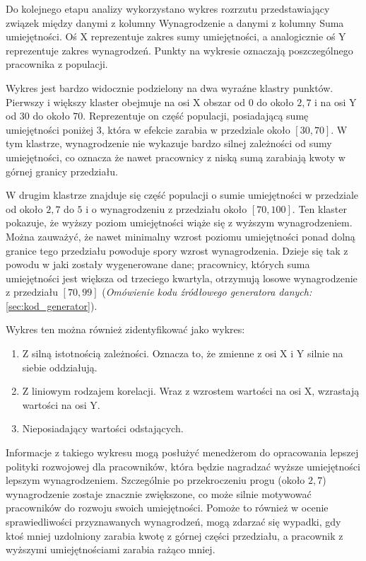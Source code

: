     \par Do kolejnego etapu analizy wykorzystano wykres rozrzutu przedstawiający związek między danymi z kolumny Wynagrodzenie a danymi z kolumny Suma umiejętności. Oś X reprezentuje zakres sumy umiejętności, a analogicznie oś Y reprezentuje zakres wynagrodzeń. Punkty na wykresie oznaczają poszczególnego pracownika z populacji.

    \par Wykres jest bardzo widocznie podzielony na dwa wyraźne klastry punktów. Pierwszy i większy klaster obejmuje na osi X obszar od $0$ do około $2,7$ i na osi Y od $30$ do około $70$. Reprezentuje on część populacji, posiadającą sumę umiejętności poniżej $3$, która w efekcie zarabia w przedziale około $[30, 70]$. W tym klastrze, wynagrodzenie nie wykazuje bardzo silnej zależności od sumy umiejętności, co oznacza że nawet pracownicy z niską sumą zarabiają kwoty w górnej granicy przedziału. 

    \par W drugim klastrze znajduje się część populacji o sumie umiejętności w przedziale od około $2,7$ do $5$ i o wynagrodzeniu z przedziału około $[70, 100]$. Ten klaster pokazuje, że wyższy poziom umiejętności wiąże się z wyższym wynagrodzeniem. Można zauważyć, że nawet minimalny wzrost poziomu umiejętności ponad dolną granice tego przedziału powoduje spory wzrost wynagrodzenia. Dzieje się tak z powodu w jaki zostały wygenerowane dane; pracownicy, których suma umiejętności jest większa od trzeciego kwartyla, otrzymują losowe wynagrodzenie z przedziału $[70, 99]$ (\textit{Omówienie kodu źródłowego generatora danych:} \ref{sec:kod_generator}). 

    \par Wykres ten można również zidentyfikować jako wykres:
    \begin{enumerate}
        \item Z silną istotnością zależności. Oznacza to, że zmienne z osi X i Y silnie na siebie oddziałują.
        \item Z liniowym rodzajem korelacji. Wraz z wzrostem wartości na osi X, wzrastają wartości na osi Y.
        \item Nieposiadający wartości odstających.
    \end{enumerate}

    \par Informacje z takiego wykresu mogą posłużyć menedżerom do opracowania lepszej polityki rozwojowej dla pracowników, która będzie nagradzać wyższe umiejętności lepszym wynagrodzeniem. Szczególnie po przekroczeniu progu (około $2,7$) wynagrodzenie zostaje znacznie zwiększone, co może silnie motywować pracowników do rozwoju swoich umiejętności. Pomoże to również w ocenie sprawiedliwości przyznawanych wynagrodzeń, mogą zdarzać się wypadki, gdy ktoś mniej uzdolniony zarabia kwotę z górnej części przedziału, a pracownik z wyższymi umiejętnościami zarabia rażąco mniej.


